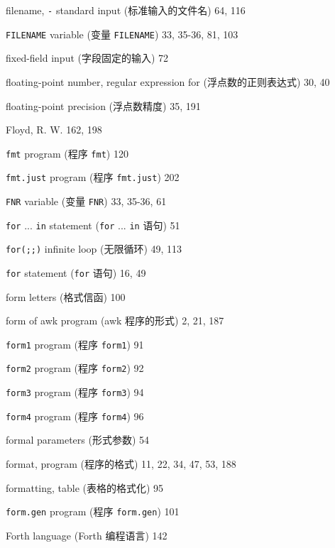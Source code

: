\begin{multicols}{2}
\hangindent=2pc  filename, \verb'-' standard input
(标准输入的文件名) 64, 116

\hangindent=2pc  \verb'FILENAME' variable (变量
\verb'FILENAME') 33, 35-36, 81, 103

\hangindent=2pc  fixed-field input (字段固定的输入) 72

\hangindent=2pc  floating-point number, regular expression for
(浮点数的正则表达式) 30, 40

\hangindent=2pc  floating-point precision (浮点数精度) 35, 191

\hangindent=2pc  Floyd, R. W. 162, 198

\hangindent=2pc  \verb'fmt' program (程序 \verb'fmt') 120

\hangindent=2pc  \verb'fmt.just' program (程序 \verb'fmt.just') 202

\hangindent=2pc  \verb'FNR' variable (变量 \verb'FNR') 33, 35-36, 61

\hangindent=2pc  \verb'for' ... \verb'in' statement (\verb'for'
... \verb'in' 语句) 51

\hangindent=2pc  \verb'for(;;)' infinite loop (无限循环) 49, 113

\hangindent=2pc  \verb'for' statement (\verb'for' 语句) 16, 49

\hangindent=2pc  form letters (格式信函) 100

\hangindent=2pc  form of awk program (awk 程序的形式) 2, 21, 187

\hangindent=2pc  \verb'form1' program (程序 \verb'form1') 91

\hangindent=2pc  \verb'form2' program (程序 \verb'form2') 92

\hangindent=2pc  \verb'form3' program (程序 \verb'form3') 94

\hangindent=2pc  \verb'form4' program (程序 \verb'form4') 96

\hangindent=2pc  formal parameters (形式参数) 54

\hangindent=2pc  format, program (程序的格式)
11, 22, 34, 47, 53, 188

\hangindent=2pc  formatting, table (表格的格式化) 95

\hangindent=2pc  \verb'form.gen' program (程序 \verb'form.gen') 101

\hangindent=2pc  Forth language (Forth 编程语言) 142


\end{multicols}
